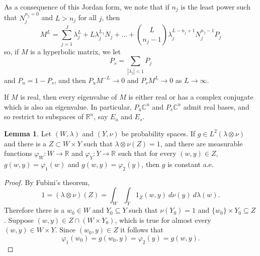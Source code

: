 \documentclass[12pt]{report}
\newcommand{\RR}{\mathbb{R}}
\newcommand{\CC}{\mathbb{C}}
\theoremstyle{definition}
\newtheorem{lemma}[theorem]{Lemma}
\begin{document}
As a consequence of this Jordan form, we note that if $n_j$ is the least power such that $N_j^{n_j = 0}$ and $L > n_j$ for all $j$, then
$$M^L = \sum_{j=1}^J \lambda_j^L + L\lambda_j^{L_1}N_j + \dots + \binom{L}{n_j-1}\lambda_j^{L-n_j+1} N_j^{n_j-1} P_j$$
so, if $M$ is a hyperbolic matrix, we let
$$P_s = \sum_{|\lambda_j| < 1} P_j$$
and $P_u = 1 - P_s$, and then $P_uM^{-L} \to 0$ and $P_sM^L \to 0$ as $L \to \infty$.

If $M$ is real, then every eigenvalue of $M$ is either real or has a complex conjugate which is also an eigenvalue. In particular, $P_u\CC^n$ and $P_s\CC^n$ admit real bases, and so restrict to subspaces of $\RR^n$, say $E_u$ and $E_s$.
\begin{lemma}
Let $(W, \lambda)$ and $(Y, \nu)$ be probability spaces. If $g \in L^2(\lambda \otimes \nu)$ and there is a $Z \subset W \times Y$ such that $\lambda \otimes \nu(Z) = 1$, and there are measurable functions $\varphi_W: W \to \RR$ and $\varphi_Y: Y \to \RR$ such that
for every $(w, y) \in Z$, $g(w, y) = \varphi_1(w)$ and $g(w, y) = \varphi_2(y)$, then $g$ is constant a.e.
\end{lemma}
\begin{proof}
By Fubini's theorem,
$$1 = (\lambda \otimes \nu)(Z) = \int_W \int_Y 1_Z(w, y) ~d\nu(y) ~d\lambda(w).$$
Therefore there is a $w_0 \in W$ and $Y_0 \subseteq Y$ such that $\nu(Y_0) = 1$ and $\{w_0\} \times Y_0 \subseteq Z$. Suppose $(w, y) \in Z \cap (W \times Y_0)$, which is true for almost every $(w, y) \in W \times Y$. Since $(w_0, y) \in Z$ it follows that
$$\varphi_1(w_0) = g(w_0, y) = \varphi_2(y) = g(w, y).$$
\end{proof}
\end{document}
